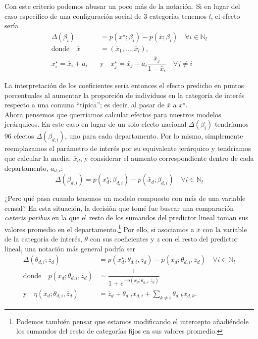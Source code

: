 Con este criterio podemos abusar un poco más de la notación. Si en lugar del caso específico de una configuración social de 3 categorías tenemos $l$, el efecto sería 
\begin{align*}
\Delta(\beta_i) &= p(x^\star;\beta_i)-p(\bar{x};\beta_i) \quad \forall i \in \mathbb{N}_l \\
\text{donde} \quad \bar{x} &= (\bar{x}_1,\dots,\bar{x}_{l}), \\ 
x_i^\star = \bar{x}_i + a_i \quad &\text{y} \quad x_j^\star =\bar{x}_j - a_i\dfrac{\bar{x}_j}{1- \bar{x}_i} \quad \forall j \neq i 
\end{align*}

La interpretación de los coeficientes sería entonces el efecto predicho en puntos porcentuales al aumentar la proporción de individuos en la categoría de interés respecto a una comuna ``típica''; es decir, al pasar de $\bar{x}$ a $x^\star$.\\ 

Ahora pensemos que querríamos calcular efectos para nuestros modelos jerárquicos. En este caso en lugar de un solo efecto nacional $\Delta(\beta_i)$ tendríamos 96 efectos $\Delta(\beta_{d,i})$, uno para cada departamento. Por lo mismo, simplemente reemplazamos el parámetro de interés por su equivalente jerárquico y tendríamos que calcular la media, $\bar{x}_{d}$, y considerar el aumento correspondiente dentro de cada departamento, $a_{d,i}$: 
\begin{equation*}
\Delta(\beta_{d,i}) =  p(x^\star_{d};\beta_{d,i})-p(\bar{x}_{d};\beta_{d,i}) \quad \forall i \in \mathbb{N}_l
\end{equation*}

¿Pero qué pasa cuando tenemos un modelo compuesto con más de una variable censal? En esta situación, la decisión que tomé fue buscar una comparación \textit{c\ae teris paribus} en la que el resto de los sumandos del predictor lineal toman sus valores promedio en el departamento.\footnote{Podemos también pensar que estamos modificando el intercepto añadiéndole los sumandos del resto de categorías fijos en sus valores promedio.} Por ello, si asociamos a $x$ con la variable de la categoría de interés, $\theta$ con sus coeficientes y $z$ con el resto del predictor lineal, una notación más general podría ser
\begin{align}\label{eq:Efecto_Enchufado_Compuesto}
\Delta(\theta_{d,i};\bar{z}_d) &= p(x_d^\star;\theta_{d,i},\bar{z}_d)-p(\bar{x}_d;\theta_{d,i},\bar{z}_d) \quad \forall i \in \mathbb{N}_l \\
\text{donde} \quad p(x_d;\theta_{d,i},\bar{z}_d) &=\dfrac{1}{1+e^{-\eta(x_d;\theta_{d,i},\bar{z}_d)}} \nonumber \\
\text{y} \quad \eta(x_d;\theta_{d,i},\bar{z}_d) &= \bar{z}_d + \theta_{d,i}x_{d,i} + \sum\limits_{k\neq i} \theta_{d,k}x_{d,k}. \nonumber
\end{align}

